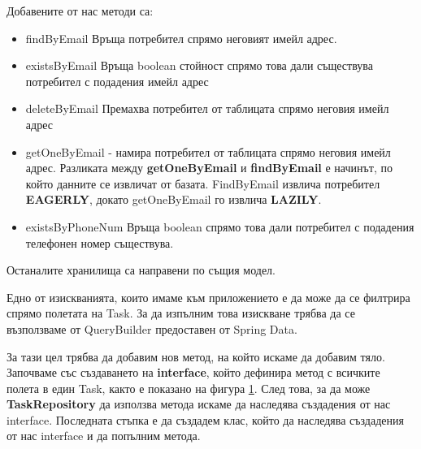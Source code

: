         Добавените от нас методи са:
        \begin{itemize}
            \item findByEmail
             Връща потребител спрямо неговият имейл адрес.
            \item existsByEmail 
            Връща boolean стойност спрямо това дали съществува потребител с подадения имейл адрес
            \item deleteByEmail
            Премахва потребител от таблицата спрямо неговия имейл адрес
            \item getOneByEmail - намира потребител от таблицата спрямо неговия имейл адрес. Разликата между \textbf{getOneByEmail} и \textbf{findByEmail} е начинът, по който данните се извличат от базата. FindByEmail извлича потребител \textbf{EAGERLY}, докато getOneByEmail го извлича \textbf{LAZILY}.
            \item existsByPhoneNum
            Връща boolean спрямо това дали потребител с подадения телефонен номер съществува.
        \end{itemize}
        
        Останалите хранилища са направени по същия модел.
        
        Едно от изискванията, които имаме към приложението е да може да се филтрира спрямо полетата на Task. За да изпълним това изискване трябва да се възползваме от QueryBuilder предоставен от Spring Data. 
        
        \begin{figure}[h]
            \centering
            \caption{}
            \label{fig:task_repository}
        \end{figure}
        
        За тази цел трябва да добавим нов метод, на който искаме да добавим тяло. Започваме със създаването на \textbf{interface}, който дефинира метод с всичките полета в един Task, както е показано на фигура \ref{fig:task_repository}. След това, за да може \textbf{TaskRepository} да използва метода искаме да наследява създадения от нас interface.
        Последната стъпка е да създадем клас, който да наследява създадения от нас interface и да попълним метода.
        
